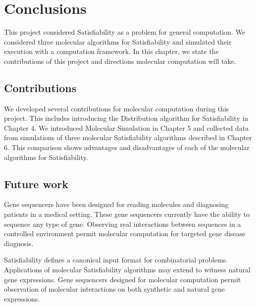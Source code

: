 \chapter{Conclusions}

This project considered {\sc Satisfiability} as a problem for general computation.  We considered three molecular algorithms for {\sc Satisfiability} and simulated their execution with a computation framework.  In this chapter, we state the contributions of this project and directions molecular computation will take.
	
	\section{Contributions}

We developed several contributions for molecular computation during this project.  This includes introducing the Distribution algorithm for {\sc Satisfiability} in Chapter 4.  We introduced Molecular Simulation in Chapter 5 and collected data from simulations of three molecular {\sc Satisfiability} algorithms described in Chapter 6.  This comparison shows advantages and disadvantages of each of the molecular algorithms for {\sc Satisfiability}.


	\section{Future work}
	
Gene sequencers have been designed for reading molecules and diagnosing patients in a medical setting.  These gene sequencers currently have the ability to sequence any type of gene.  Observing real interactions between sequences in a controlled environment permit molecular computation for targeted gene disease diagnosis.

{\sc Satisfiability} defines a canonical input format for combinatorial problems.  Applications of molecular {\sc Satisfiability} algorithms may extend to witness natural gene expressions.  Gene sequencers designed for molecular computation permit observation of molecular interactions on both synthetic and natural gene expressions. 
